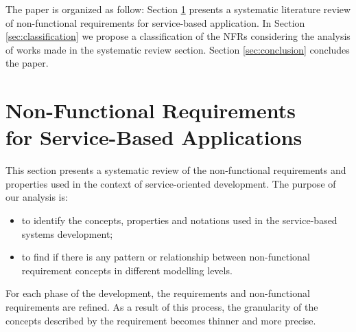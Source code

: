 \documentclass{sig-alternate}
\begin{document}
%  

The paper is organized as follow: Section \ref{sec:nfrs} presents a systematic
literature review of non-functional requirements for service-based application.
In Section \ref{sec:classification} we propose a classification of the NFRs
considering the analysis of works made in the systematic review section. Section
\ref{sec:conclusion} concludes the paper.
   
\section{Non-Functional Requirements\\ for Service-Based Applications}   
\label{sec:nfrs}   

This section presents a systematic review of the non-func\-tion\-al
requirements and properties used in the context of service-oriented
development. The purpose of our analysis is:
\begin{itemize}
  \item to identify the concepts, properties and notations used in the
  service-based systems development;
  \item to find if there is any pattern or relationship between non-functional
requirement concepts in different modelling levels.
\end{itemize}

For each phase of the development, the requirements and non-functional
requirements are refined. As a result of this process, the granularity of the
concepts described by the requirement becomes thinner and more precise. 

\end{document}
